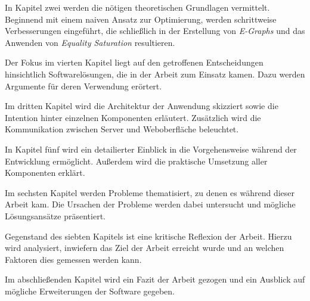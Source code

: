 \vspace{-2mm}

In Kapitel zwei werden die nötigen theoretischen Grundlagen vermittelt. Beginnend mit einem naiven Ansatz zur Optimierung, werden schrittweise Verbesserungen
eingeführt, die schließlich in der Erstellung von \textit{E-Graphs} und das Anwenden von \textit{Equality Saturation} resultieren. 

\vspace{6mm}

\vspace{-2mm}

Der Fokus im vierten Kapitel liegt auf den getroffenen Entscheidungen hinsichtlich Softwarelösungen, die in der Arbeit zum Einsatz kamen. Dazu werden Argumente für deren Verwendung erörtert.

\vspace{6mm}

\vspace{-2mm}

Im dritten Kapitel wird die Architektur der Anwendung skizziert sowie die Intention hinter einzelnen Komponenten erläutert. Zusätzlich wird die Kommunikation zwischen 
Server und Weboberfläche beleuchtet. 

\vspace{6mm}

\vspace{-2mm}

In Kapitel fünf wird ein detailierter Einblick in die Vorgehensweise während der Entwicklung ermöglicht. Außerdem wird die praktische Umsetzung aller Komponenten erklärt.

\vspace{6mm}

\vspace{-2mm}

Im sechsten Kapitel werden Probleme thematisiert, zu denen es während dieser Arbeit kam. Die Ursachen der Probleme werden dabei untersucht und mögliche Lösungsansätze präsentiert. 

\vspace{6mm}

\vspace{-2mm}

Gegenstand des siebten Kapitels ist eine kritische Reflexion der Arbeit. Hierzu wird analysiert, inwiefern das Ziel der Arbeit erreicht wurde und an welchen Faktoren dies gemessen werden kann.

\vspace{6mm}

\vspace{-2mm}

Im abschließenden Kapitel wird ein Fazit der Arbeit gezogen und ein Ausblick auf mögliche Erweiterungen der Software gegeben.
